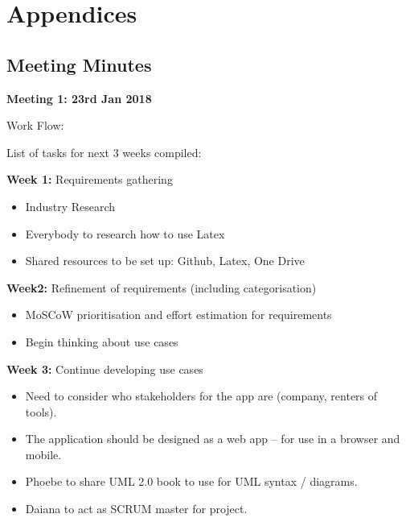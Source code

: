 \documentclass[fontsize=11pt]{extarticle}
\numberwithin{figure}{section} %
\numberwithin{table}{section}%
\begin{document}
\printbibliography


\newpage
\section{Appendices}

\subsection{Meeting Minutes}

\textbf{Meeting 1: 23rd Jan 2018}

Work Flow:

List of tasks for next 3 weeks compiled:

\textbf{Week 1:} Requirements gathering

\begin{itemize}
  \item Industry Research
  \item Everybody to research how to use Latex
  \item Shared resources to be set up: Github, Latex, One Drive

\end{itemize}


\textbf{Week2:} Refinement of requirements (including categorisation)

\begin{itemize}
  \item MoSCoW prioritisation and effort estimation for requirements
  \item Begin thinking about use cases


\end{itemize}


\textbf{Week 3:} Continue developing use cases

\begin{itemize}
  \item Need to consider who stakeholders for the app are (company, renters of tools).
  \item The application should be designed as a web app – for use in a browser and mobile.
  \item Phoebe to share UML 2.0 book to use for UML syntax / diagrams.
  \item Daiana to act as SCRUM master for project.


\end{itemize}
\end{document}
